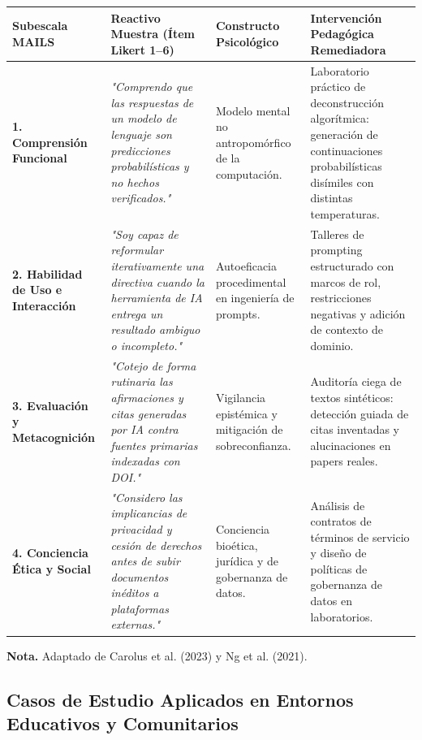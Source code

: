 \begin{table}[htpb!]
\centering
\small
\begin{tabularx}{\textwidth}{p{3.2cm} p{4.2cm} p{3.8cm} X}
\toprule
\textbf{Subescala MAILS} & \textbf{Reactivo Muestra (Ítem Likert 1--6)} & \textbf{Constructo Psicológico} & \textbf{Intervención Pedagógica Remediadora} \\
\midrule
\textbf{1. Comprensión Funcional} & \textit{"Comprendo que las respuestas de un modelo de lenguaje son predicciones probabilísticas y no hechos verificados."} & Modelo mental no antropomórfico de la computación. & Laboratorio práctico de deconstrucción algorítmica: generación de continuaciones probabilísticas disímiles con distintas temperaturas. \\
\midrule
\textbf{2. Habilidad de Uso e Interacción} & \textit{"Soy capaz de reformular iterativamente una directiva cuando la herramienta de IA entrega un resultado ambiguo o incompleto."} & Autoeficacia procedimental en ingeniería de prompts. & Talleres de prompting estructurado con marcos de rol, restricciones negativas y adición de contexto de dominio. \\
\midrule
\textbf{3. Evaluación y Metacognición} & \textit{"Cotejo de forma rutinaria las afirmaciones y citas generadas por IA contra fuentes primarias indexadas con DOI."} & Vigilancia epistémica y mitigación de sobreconfianza. & Auditoría ciega de textos sintéticos: detección guiada de citas inventadas y alucinaciones en papers reales. \\
\midrule
\textbf{4. Conciencia Ética y Social} & \textit{"Considero las implicancias de privacidad y cesión de derechos antes de subir documentos inéditos a plataformas externas."} & Conciencia bioética, jurídica y de gobernanza de datos. & Análisis de contratos de términos de servicio y diseño de políticas de gobernanza de datos en laboratorios. \\
\bottomrule
\end{tabularx}
\vspace{0.2cm}
\begin{flushleft}
\scriptsize \textbf{Nota.} Adaptado de Carolus et al. (2023) y Ng et al. (2021).
\end{flushleft}
\end{table}

\newpage

\subsection{Casos de Estudio Aplicados en Entornos Educativos y Comunitarios}

